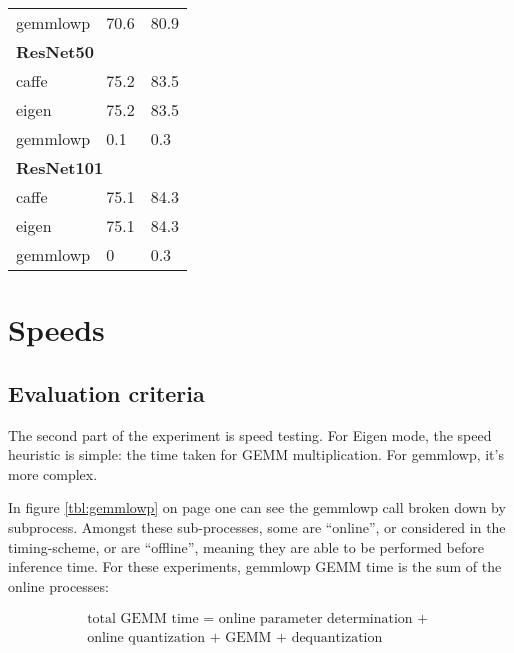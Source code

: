 \begin{table}[]
\begin{tabular}{lll}
gemmlowp             & 70.6                                         & 80.9                                         \\
\multicolumn{3}{l}{\textbf{ResNet50}}                                                                             \\
caffe                & 75.2                                        & 83.5                                        \\
eigen                & 75.2                                         & 83.5                                        \\
gemmlowp             & 0.1                                         & 0.3                                          \\
\multicolumn{3}{l}{\textbf{ResNet101}}                                                                          \\
caffe                & 75.1                                          & 84.3                 \\
eigen                & 75.1                                        & 84.3                   \\
gemmlowp             & 0                                             & 0.3                                         
\end{tabular}
\end{table}

\section{Speeds}
\subsection{Evaluation criteria}
The second part of the experiment is speed testing. For Eigen mode, the speed heuristic is simple: the time taken for GEMM multiplication. For gemmlowp, it's more complex.

In figure \ref{tbl:gemmlowp} on page \pageref{tbl:gemmlowp} one can see the gemmlowp call broken down by subprocess. Amongst these sub-processes, some are ``online'', or considered in the timing-scheme, or are ``offline'', meaning they are able to be performed before inference time. For these experiments, gemmlowp GEMM time is the sum of the online processes:

\begin{equation}
\label{eqn:quantgemm}
\begin{split}
\text{total GEMM time = } \text{online parameter determination + } \\
\text{online quantization + } 
\text{GEMM + } \text{dequantization}
\end{split}
\end{equation}

